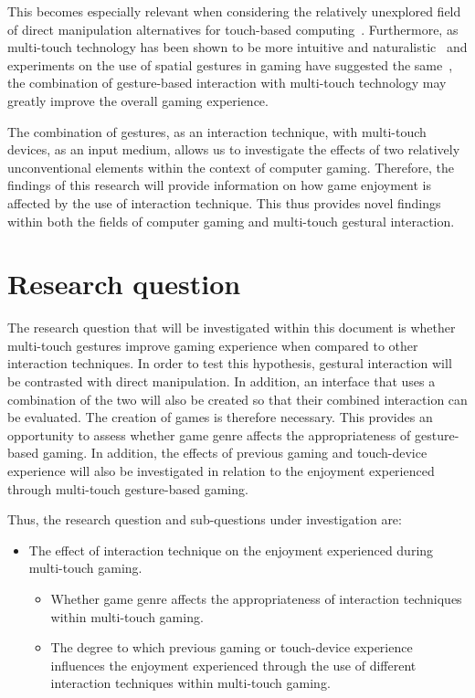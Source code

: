 This becomes especially relevant when considering the relatively unexplored field of direct manipulation alternatives for touch-based computing~\citep{Kin09}. Furthermore, as multi-touch technology has been shown to be more intuitive and naturalistic~\citep{Forl07} and experiments on the use of spatial gestures in gaming have suggested the same~\citep{Payn06}, the combination of gesture-based interaction with multi-touch technology may greatly improve the overall gaming experience.

The combination of gestures, as an interaction technique, with multi-touch devices, as an input medium, allows us to investigate the effects of two relatively unconventional elements within the context of computer gaming. Therefore, the findings of this research will provide information on how game enjoyment is affected by the use of interaction technique. This thus provides novel findings within both the fields of computer gaming and multi-touch gestural interaction. 

\section{Research question}
The research question that will be investigated within this document is whether multi-touch gestures improve gaming experience when compared to other interaction techniques. In order to test this hypothesis, gestural interaction will be contrasted with direct manipulation. In addition, an interface that uses a combination of the two will also be created so that their combined interaction can be evaluated. The creation of games is therefore necessary. This provides an opportunity to assess whether game genre affects the appropriateness of gesture-based gaming. In addition, the effects of previous gaming and touch-device experience will also be investigated in relation to the enjoyment experienced through multi-touch gesture-based gaming.

Thus, the research question and sub-questions under investigation are:
\begin{itemize}
\item The effect of interaction technique on the enjoyment experienced during multi-touch gaming.
\begin{itemize}
\renewcommand{\labelitemii}{$\bullet$}
\item Whether game genre affects the appropriateness of interaction techniques within multi-touch gaming.
\item The degree to which previous gaming or touch-device experience influences the enjoyment experienced through the use of different interaction techniques within multi-touch gaming. 
\end{itemize}
\end{itemize}


